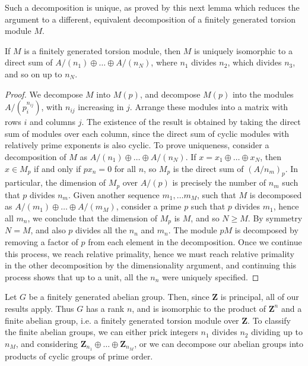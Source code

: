 Such a decomposition is unique, as proved by this next lemma which reduces the argument to a different, equivalent decomposition of a finitely generated torsion module $M$.

\begin{lemma}
    If $M$ is a finitely generated torsion module, then $M$ is uniquely isomorphic to a direct sum of $A/(n_1) \oplus \dots \oplus A/(n_N)$, where $n_1$ divides $n_2$, which divides $n_3$, and so on up to $n_N$.
\end{lemma}
\begin{proof}
    We decompose $M$ into $M(p)$, and decompose $M(p)$ into the modules $A/(p_i^{n_{ij}})$, with $n_{ij}$ increasing in $j$. Arrange these modules into a matrix with rows $i$ and columns $j$. The existence of the result is obtained by taking the direct sum of modules over each column, since the direct sum of cyclic modules with relatively prime exponents is also cyclic. To prove uniqueness, consider a decomposition of $M$ as $A/(n_1) \oplus \dots \oplus A/(n_N)$. If $x = x_1 \oplus \dots \oplus x_N$, then $x \in M_p$ if and only if $px_n = 0$ for all $n$, so $M_p$ is the direct sum of $(A/n_m)_p$. In particular, the dimension of $M_p$ over $A/(p)$ is precisely the number of $n_m$ such that $p$ divides $n_m$. Given another sequence $m_1, \dots m_M$, such that $M$ is decomposed as $A/(m_1) \oplus \dots \oplus A/(m_M)$, consider a prime $p$ such that $p$ divides $m_1$, hence all $m_n$, we conclude that the dimension of $M_p$ is $M$, and so $N \geq M$. By symmetry $N = M$, and also $p$ divides all the $n_n$ and $m_n$. The module $pM$ is decomposed by removing a factor of $p$ from each element in the decomposition. Once we continue this process, we reach relative primality, hence we must reach relative primality in the other decomposition by the dimensionality argument, and continuing this process shows that up to a unit, all the $n_n$ were uniquely specified.
\end{proof}

\begin{example}
    Let $G$ be a finitely generated abelian group. Then, since $\mathbf{Z}$ is principal, all of our results apply. Thus $G$ has a rank $n$, and is isomorphic to the product of $\mathbf{Z}^n$ and a finite abelian group, i.e. a finitely generated torsion module over $\mathbf{Z}$. To classify the finite abelian groups, we can either prick integers $n_1$ divides $n_2$ dividing up to $n_M$, and considering $\mathbf{Z}_{n_1} \oplus \dots \oplus \mathbf{Z}_{n_M}$, or we can decompose our abelian groups into products of cyclic groups of prime order.
\end{example}

